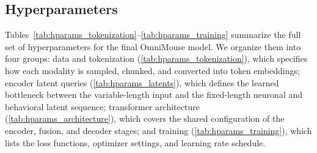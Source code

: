 \documentclass{article} %
\begin{document}


\subsection{Hyperparameters}
\label{sec:appendix_hyperparams}

Tables~\ref{tab:hparams_tokenization}--\ref{tab:hparams_training} summarize the full set of hyperparameters for the final OmniMouse model. We organize them into four groups: data and tokenization (\cref{tab:hparams_tokenization}), which specifies how each modality is sampled, chunked, and converted into token embeddings; encoder latent queries (\cref{tab:hparams_latents}), which defines the learned bottleneck between the variable-length input and the fixed-length neuronal and behavioral latent sequence; transformer architecture (\cref{tab:hparams_architecture}), which covers the shared configuration of the encoder, fusion, and decoder stages; and training (\cref{tab:hparams_training}), which lists the loss functions, optimizer settings, and learning rate schedule.


\end{document}
